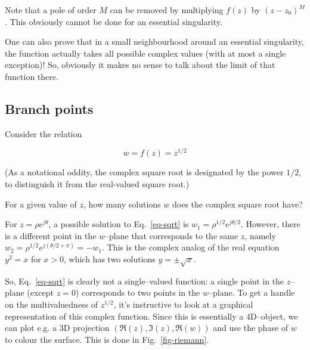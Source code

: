Note that a pole of order $M$ can be removed by multiplying $f(z)$ by $(z-z_0)^M$. This obviously cannot be done for an essential singularity.

\noindent{}One can also prove that in a small neighbourhood around an essential singularity, the function actually takes all possible complex values (with at most a single exception)! So, obviously it makes no sense to talk about the limit of that function there.

\pagebreak

\subsection*{Branch points}

Consider the relation

\begin{equation}
w = f(z) = z^{1/2} \label{eq-sqrt}
\end{equation}

(As a notational oddity, the complex square root is designated by the power $1/2$, to distinguish it from the real-valued square root.)

\begin{cue}
For a given value of $z$, how many solutions $w$ does the complex square root have? 
\end{cue}

For $z=\rho e^{j\theta}$, a possible solution to Eq.~\ref{eq-sqrt} is $w_1 = \rho^{1/2} e^{j\theta/2}$. However, there is a different point in the $w$--plane that corresponds to the same $z$, namely $w_2 = \rho^{1/2} e^{j(\theta/2+\pi)} = -w_1$. This is the complex analog of the real equation $y^2 = x$ for $x > 0$, which has two solutions $y = \pm \sqrt{x}$.

So, Eq.~\ref{eq-sqrt} is clearly not a single--valued function: a single point in the $z$--plane (except $z=0$) corresponds to two points in the $w$--plane. To get a handle on the multivaluedness of $z^{1/2}$, it's instructive to look at a graphical representation of this complex function. Since this is essentially a 4D--object, we can plot e.g. a 3D projection $(\Re(z),\Im(z),\Re(w))$ and use the phase of $w$ to colour the surface. This is done in Fig.~\ref{fig-riemann}.

